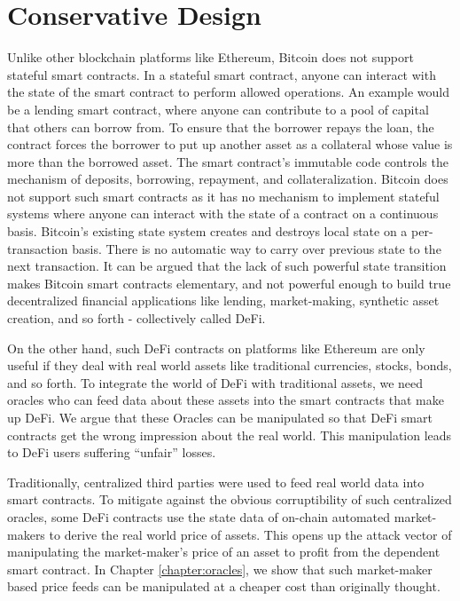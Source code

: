 \section{Conservative Design}
Unlike other blockchain platforms like Ethereum, Bitcoin does not support stateful smart contracts. In a stateful smart contract, anyone can interact with the state of the smart contract to perform allowed operations. An example would be a lending smart contract, where anyone can contribute to a pool of capital that others can borrow from. To ensure that the borrower repays the loan, the contract forces the borrower to put up another asset as a collateral whose value is more than the borrowed asset. The smart contract's immutable code controls the mechanism of deposits, borrowing, repayment, and collateralization. Bitcoin does not support such smart contracts as it has no mechanism to implement stateful systems where anyone can interact with the state of a contract on a continuous basis. Bitcoin's existing state system creates and destroys local state on a per-transaction basis. There is no automatic way to carry over previous state to the next transaction. It can be argued that the lack of such powerful state transition makes Bitcoin smart contracts elementary, and not powerful enough to build true decentralized financial applications like lending, market-making, synthetic asset creation, and so forth - collectively called DeFi.

On the other hand, such DeFi contracts on platforms like Ethereum are only useful if they deal with real world assets like traditional currencies, stocks, bonds, and so forth. To integrate the world of DeFi with traditional assets, we need oracles who can feed data about these assets into the smart contracts that make up DeFi. We argue that these Oracles can be manipulated so that DeFi smart contracts get the wrong impression about the real world. This manipulation leads to DeFi users suffering ``unfair'' losses. 

Traditionally, centralized third parties were used to feed real world data into smart contracts. To mitigate against the obvious corruptibility of such centralized oracles, some DeFi contracts use the state data of on-chain automated market-makers to derive the real world price of assets. This opens up the attack vector of manipulating the market-maker's price of an asset to profit from the dependent smart contract. In Chapter \ref{chapter:oracles}, we show that such market-maker based price feeds can be manipulated at a cheaper cost than originally thought. 

